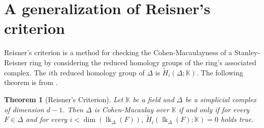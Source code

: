 \documentclass[11pt]{amsart}
\numberwithin{equation}{section}
\newtheorem{theorem}{Theorem}[section]
\theoremstyle{definition}
\theoremstyle{remark}
\newtheorem{example}[theorem]{Example}
\newcommand{\lk}{\operatorname{lk}}
\begin{document}
\iffalse

One can use Macaulay 2 to compute the graded Betti numbers and produce the following example.


\begin{example}
Let $I$ be the ideal with Alexander dual \[ I^\vee= \langle efgh, afgh, defg, abgh, acfh, cdef, bdeg, abeg, acef, cdfh, bdgh, cdgh, \] \[ bdfh, abef, aceg, abdf, acdg, abcd \rangle. \]  The non-vanishing graded Betti numbers of $I^\vee$ are $\beta_{0,4}, \beta_{1,5}, \beta_{2,6}, \beta_{2,7}, \beta_{3,8}$.  Then we have 

\noindent$R =\mathbb{K}[a,b,c,d,e,f,g,h]/I$ satisfies $(S_2)$ and $(S_4^1)$.
\end{example}
\fi

\iffalse

\begin{example}
Let $I$ be the ideal with Alexander dual \[ I^\vee= \langle efgh, afgh, defg, abgh, acfh, cdef, bdeg, abrg, acef, cdfh, \] \[ bdgh, cdgh, bdfh, abef, acer, abdf, ardg, abcd. \rangle \].  The non-vanishing graded Betti numbers are INSERT THEM HERE.  Then $R =\mathbb{K}[a,b,c,d,e,f,g,h,r]/I$ satisfies FIGURE THIS OUT and $(S_5^1)$.
\end{example}

\fi

\section{A generalization of Reisner's criterion}

Reisner's criterion is a method for checking the Cohen-Macaulayness of a Stanley-Reisner ring by considering the reduced homology groups of the ring's associated complex. The $i$th reduced homology group of $\Delta$ is $\tilde{H}_i(\Delta ; \mathbb{K})$. The following theorem is from \cite{Re76}.

\begin{theorem}[Reisner's Criterion]
Let $\mathbb{K}$ be a field and $\Delta$ be a simplicial complex of dimension $d - 1$. Then $\Delta$ is Cohen-Macaulay over
$\mathbb{K}$ if and only if for every $F \in \Delta$ and for every $i < \dim(\lk_{\Delta}(F))$, $\tilde{H}_i(\lk_{\Delta}(F);\mathbb{K}) = 0$ holds true.
\end{theorem}
\end{document}
